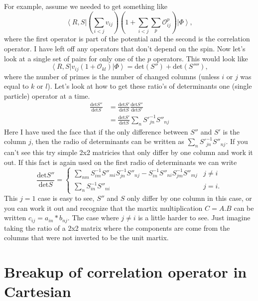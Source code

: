 \documentclass[12pt]{extarticle}
\newcommand{\Okl}{\mathcal{O}_{kl}}
\newcommand{\Oijp}{\mathcal{O}^p_{ij}}
\newcommand{\ket}[1]{\left| #1 \right>}
\newcommand{\bra}[1]{\left< #1 \right|}
\newcommand{\detr}{\mathrm{det}}
\begin{document}
For example, assume we needed to get something like
\begin{equation}
  \bra{R,S}(\sum_{i<j}v_{ij})(1+\sum_{i<j}\sum_p \Oijp) \ket{\Phi},
\end{equation}
where the first operator is part of the potential and the second is the correlation operator. I have left off any operators that don't depend on the spin. Now let's look at a single set of pairs for only one of the $p$ operators. This would look like
\begin{equation}
  \bra{R,S} v_{ij}(1+\Okl) \ket{\Phi} = \mathrm{det}(S'') + \mathrm{det}(S''''),
\end{equation}
where the number of primes is the number of changed columns (unless $i$ or $j$ was equal to $k$ or $l$). Let's look at how to get these ratio's of determinants one (single particle) operator at a time.
\begin{align}
  \frac{\mathrm{det}S''}{\mathrm{det}S} &= \frac{\detr S'}{\detr S}\frac{\detr S''}{\detr S'} \\
  &= \frac{\detr S'}{\detr S}\sum_n S'^{-1}_{jn}S''_{nj}
\end{align}
Here I have used the face that if the only difference between $S''$ and $S'$ is the column $j$, then the radio of determinants can be written as $\sum_n S'^{-1}_{jn}S''_{nj}$. If you can't see this try simple 2x2 matricies that only differ by one column and work it out. If this fact is again used on the first radio of determinants we can write
\begin{equation}
  \frac{\mathrm{det}S''}{\mathrm{det}S} = \begin{cases}
  \sum_{nm} S^{-1}_{im}S''_{mi}S^{-1}_{jn}S''_{nj} - S^{-1}_{in}S''_{ni}S^{-1}_{jm}S''_{mj} & j \neq i \\
  \sum_n S^{-1}_{in}S''_{ni} & j = i.
  \end{cases}
\end{equation}
This $j=1$ case is easy to see, $S''$ and $S$ only differ by one column in this case, or you can work it out and recognize that the martix multiplication $C=A.B$ can be written $c_{ij} = a_{in}*b_{nj}$. The case where $j \neq i$ is a little harder to see. Just imagine taking the ratio of a 2x2 matrix where the components are come from the columns that were not inverted to be the unit martix.

\section{Breakup of correlation operator in Cartesian}
\end{document}
